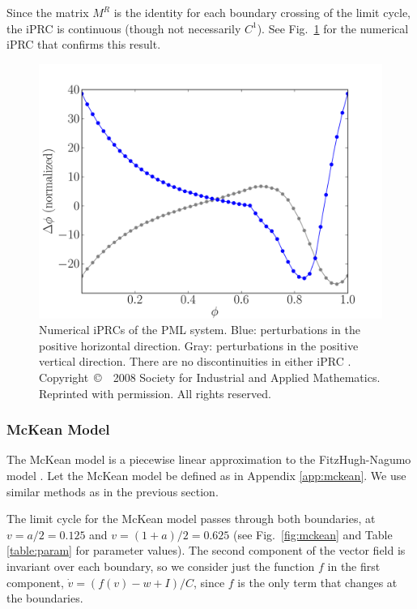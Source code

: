 \documentclass[12pt]{article}
\begin{document}
Since the matrix $M^R$ is the identity for each boundary crossing of the limit cycle, the iPRC is continuous (though not necessarily $C^1$).  See Fig.~\ref{fig:pml_iprc} for the numerical iPRC that confirms this result.

\begin{figure}[h!]
\begin{center} \includegraphics[width=1\textwidth]{pml_prc_fig.pdf}\end{center}
\caption[Numerical iPRCs of the PML system]{Numerical iPRCs of the PML system. Blue: perturbations in the positive horizontal direction. Gray: perturbations in the positive vertical direction.  There are no discontinuities in either iPRC \cite{Coombes:2008:SIADS}. Copyright~\copyright~~2008 Society for Industrial and Applied Mathematics.  Reprinted with permission.  All rights reserved.}
\label{fig:pml_iprc}\end{figure}

\subsubsection{McKean Model}
The McKean model is a piecewise linear approximation to the FitzHugh-Nagumo model \cite{McKean1970}.  Let the McKean model be defined as in Appendix \ref{app:mckean}.  We use similar methods as in the previous section. 

The limit cycle for the McKean model passes through both boundaries, at $v = a/2 = 0.125$ and $v = (1+a)/2 = 0.625$ (see Fig.~\ref{fig:mckean} and Table \ref{table:param} for parameter values).  The second component of the vector field is invariant over each boundary, so we consider just the function $f$ in the first component, $\dot{v} = (f(v) - w + I)/C$, since $f$ is the only term that changes at the boundaries.
\end{document}
